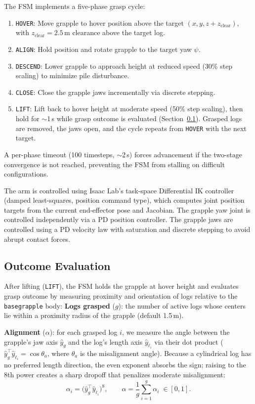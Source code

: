 \documentclass[conference]{IEEEtran}
\begin{document}
The FSM implements a five-phase grasp cycle:
\begin{enumerate}
    \item \texttt{HOVER}: Move grapple to hover position above the target $(x, y, z + z_{\text{clear}})$, with $z_{\text{clear}} = 2.5$\,m clearance above the target log.
    \item \texttt{ALIGN}: Hold position and rotate grapple to the target yaw $\psi$.
    \item \texttt{DESCEND}: Lower grapple to approach height at reduced speed (30\% step scaling) to minimize pile disturbance.
    \item \texttt{CLOSE}: Close the grapple jaws incrementally via discrete stepping.
    \item \texttt{LIFT}: Lift back to hover height at moderate speed (50\% step scaling), then hold for $\sim$1\,s while grasp outcome is evaluated (Section~\ref{sec:outcome}). Grasped logs are removed, the jaws open, and the cycle repeats from \texttt{HOVER} with the next target.
\end{enumerate}
A per-phase timeout (100 timesteps, $\sim$2\,s) forces advancement if the two-stage convergence is not reached, preventing the FSM from stalling on difficult configurations.

The arm is controlled using Isaac Lab's task-space Differential IK controller~\cite{mittal2023orbit} (damped least-squares, position command type), which computes joint position targets from the current end-effector pose and Jacobian.
The grapple yaw joint is controlled independently via a PD position controller.
The grapple jaws are controlled using a PD velocity law with saturation and discrete stepping to avoid abrupt contact forces.

\subsection{Outcome Evaluation}
\label{sec:outcome}
After lifting (\texttt{LIFT}), the FSM holds the grapple at hover height and evaluates grasp outcome by measuring proximity and orientation of logs relative to the \texttt{basegrapple} body:
\textbf{Logs grasped} ($g$): the number of active logs whose centers lie within a proximity radius of the grapple (default 1.5\,m).

\textbf{Alignment} ($\alpha$): for each grasped log $i$, we measure the angle between the grapple's jaw axis $\hat{y}_g$ and the log's length axis $\hat{y}_{\ell_i}$ via their dot product ($\hat{y}_g^\top \hat{y}_{\ell_i} = \cos\theta_a$, where $\theta_a$ is the misalignment angle).
Because a cylindrical log has no preferred length direction, the even exponent absorbs the sign; raising to the 8th power creates a sharp dropoff that penalizes moderate misalignment:
\begin{equation}
    \alpha_i = \big(\hat{y}_g^\top \hat{y}_{\ell_i}\big)^{8}, \qquad \alpha = \frac{1}{g}\sum_{i=1}^{g} \alpha_i \;\in [0,1].
\end{equation}
\end{document}
